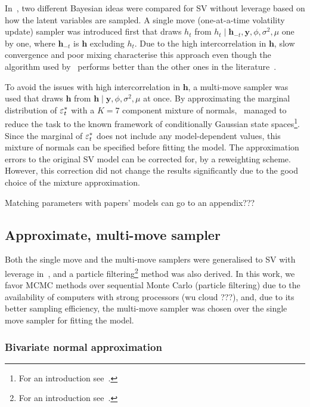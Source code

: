 In~\citet{Kim1998}, two different Bayesian ideas were compared for SV without leverage based on how the latent variables are sampled.
A single move (one-at-a-time volatility update) sampler was introduced first that draws $h_t$ from $h_t\mid\bm{h}_{-t},\bm{y},\phi,\sigma^2,\mu$ one by one, where $\bm{h}_{-t}$ is $\bm{h}$ excluding $h_t$.
Due to the high intercorrelation in $\bm{h}$, slow convergence and poor mixing characterise this approach even though the algorithm used by~\citeauthor{Kim1998} performs better than the other ones in the literature~\citep{shephard1993fitting,jarquier1994bayesian,shephard1994comment,shephard1997likelihood,geweke1994bayesian}.

To avoid the issues with high intercorrelation in $\bm{h}$, a multi-move sampler was used that draws $\bm{h}$ from $\bm{h}\mid\bm{y},\phi,\sigma^2,\mu$ at once.
By approximating the marginal distribution of $\varepsilon_t^\ast$ with a $K=7$ component mixture of normals,~\citeauthor{Kim1998} managed to reduce the task to the known framework of conditionally Gaussian state spaces\footnote{For an introduction see~\citet{Kitagawa1996}.}.
Since the marginal of $\varepsilon_t^\ast$ does not include any model-dependent values, this mixture of normals can be specified before fitting the model.
The approximation errors to the original SV model can be corrected for, by a reweighting scheme.
However, this correction did not change the results significantly due to the good choice of the mixture approximation.

Matching parameters with papers' models can go to an appendix???

\subsection[Sampling algorithm]{Approximate, multi-move sampler}

Both the single move and the multi-move samplers were generalised to SV with leverage in~\citet{Omori2007}, and a particle filtering\footnote{For an introduction see~\citet{Johannes2009}.} method was also derived.
In this work, we favor MCMC methods over sequential Monte Carlo (particle filtering) due to the availability of computers with strong processors (wu cloud ???), and, due to its better sampling efficiency, the multi-move sampler was chosen over the single move sampler for fitting the model.

\subsubsection{Bivariate normal approximation}

